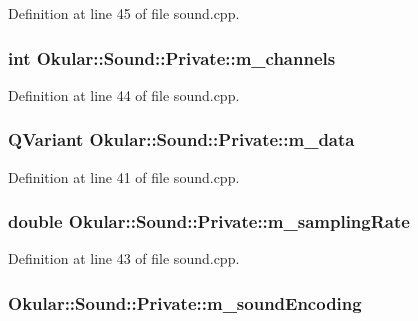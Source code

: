 Definition at line 45 of file sound.\+cpp.

\hypertarget{classSound_1_1Private_abcbbdf5cfd47dd247f6e3bd76c16c94c}{
\subsubsection[{m\+\_\+channels}]{\setlength{\rightskip}{0pt plus 5cm}int Okular\+::\+Sound\+::\+Private\+::m\+\_\+channels}}\label{classSound_1_1Private_abcbbdf5cfd47dd247f6e3bd76c16c94c}


Definition at line 44 of file sound.\+cpp.

\hypertarget{classSound_1_1Private_a7768921bd907eb0ae58ef9b91f611402}{
\subsubsection[{m\+\_\+data}]{\setlength{\rightskip}{0pt plus 5cm}Q\+Variant Okular\+::\+Sound\+::\+Private\+::m\+\_\+data}}\label{classSound_1_1Private_a7768921bd907eb0ae58ef9b91f611402}


Definition at line 41 of file sound.\+cpp.

\hypertarget{classSound_1_1Private_af993ccbc2dd61db92380c8f2bbc6bcef}{
\subsubsection[{m\+\_\+sampling\+Rate}]{\setlength{\rightskip}{0pt plus 5cm}double Okular\+::\+Sound\+::\+Private\+::m\+\_\+sampling\+Rate}}\label{classSound_1_1Private_af993ccbc2dd61db92380c8f2bbc6bcef}


Definition at line 43 of file sound.\+cpp.

\hypertarget{classSound_1_1Private_a4649c67a57652889674af514a94fb73d}{
\subsubsection[{m\+\_\+sound\+Encoding}]{ Okular\+::\+Sound\+::\+Private\+::m\+\_\+sound\+Encoding}}\label{classSound_1_1Private_a4649c67a57652889674af514a94fb73d}



